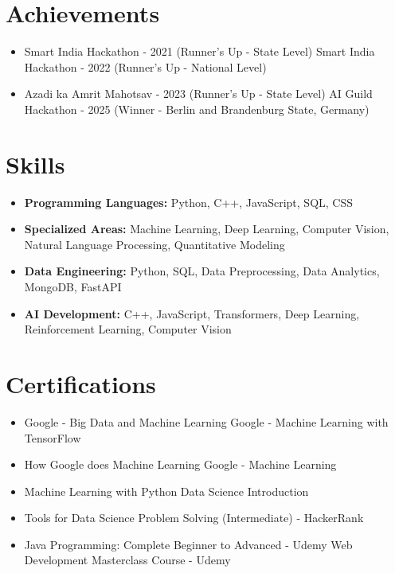 \documentclass[a4paper,10pt]{article}
\begin{document}
\section*{Achievements}
\begin{itemize}
\item Smart India Hackathon - 2021 (Runner's Up - State Level) \hfill Smart India Hackathon - 2022 (Runner's Up - National Level)
\item Azadi ka Amrit Mahotsav - 2023 (Runner's Up - State Level) \hfill AI Guild Hackathon - 2025 (Winner - Berlin and Brandenburg State, Germany)
\end{itemize}

\section*{Skills}
\begin{itemize}
  \item \textbf{Programming Languages:} Python, C++, JavaScript, SQL, CSS
  \item \textbf{Specialized Areas:} Machine Learning, Deep Learning, Computer Vision, Natural Language Processing, Quantitative Modeling
  \item \textbf{Data Engineering:} Python, SQL, Data Preprocessing, Data Analytics, MongoDB, FastAPI
  \item \textbf{AI Development:} C++, JavaScript, Transformers, Deep Learning, Reinforcement Learning, Computer Vision
\end{itemize}

\section*{Certifications}
\begin{itemize}
\item Google - Big Data and Machine Learning \hfill Google - Machine Learning with TensorFlow
\item How Google does Machine Learning \hfill Google - Machine Learning
\item Machine Learning with Python \hfill Data Science Introduction
\item Tools for Data Science \hfill Problem Solving (Intermediate) - HackerRank
\item Java Programming: Complete Beginner to Advanced - Udemy \hfill Web Development Masterclass Course - Udemy
\end{itemize}
\end{document}
